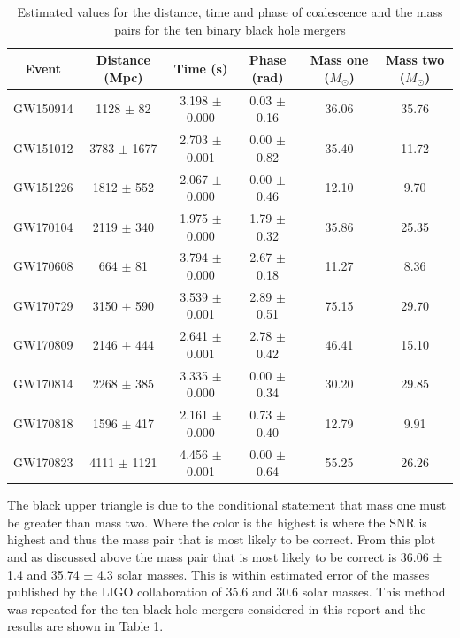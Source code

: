 \documentclass[]{article}
\begin{document}
\begin{table}[h]
    \begin{center}
        \caption{Estimated values for the distance, time and phase of coalescence and the mass pairs for the ten binary black hole mergers}
        \label{tab:estimates}
        \begin{tabular}{|c c c c c c|}
            \hline
            Event & Distance (Mpc) & Time (s) & Phase (rad) & Mass one ($M_{\odot}$) & Mass two ($M_{\odot}$)\\
            \hline
            GW150914 & 1128 $\pm$ 82 & 3.198 $\pm$ 0.000 & 0.03 $\pm$ 0.16 & 36.06 & 35.76 \\
            GW151012 & 3783 $\pm$ 1677 & 2.703 $\pm$ 0.001 & 0.00 $\pm$ 0.82 & 35.40 & 11.72 \\
            GW151226 & 1812 $\pm$ 552 & 2.067 $\pm$ 0.000 & 0.00 $\pm$ 0.46 & 12.10 & 9.70 \\
            GW170104 & 2119 $\pm$ 340 & 1.975 $\pm$ 0.000 & 1.79 $\pm$ 0.32 & 35.86 & 25.35 \\
            GW170608 & 664 $\pm$ 81 & 3.794 $\pm$ 0.000 & 2.67 $\pm$ 0.18 & 11.27 & 8.36 \\
            GW170729 & 3150 $\pm$ 590 & 3.539 $\pm$ 0.001 & 2.89 $\pm$ 0.51 & 75.15 & 29.70 \\
            GW170809 & 2146 $\pm$ 444 & 2.641 $\pm$ 0.001 & 2.78 $\pm$ 0.42 & 46.41 & 15.10 \\
            GW170814 & 2268 $\pm$ 385 & 3.335 $\pm$ 0.000 & 0.00 $\pm$ 0.34 & 30.20 & 29.85 \\
            GW170818 & 1596 $\pm$ 417 & 2.161 $\pm$ 0.000 & 0.73 $\pm$ 0.40 & 12.79 & 9.91 \\
            GW170823 & 4111 $\pm$ 1121 & 4.456 $\pm$ 0.001 & 0.00 $\pm$ 0.64 & 55.25 & 26.26 \\
            \hline
        \end{tabular}

    \end{center}
\end{table}

The black upper triangle is due to the conditional statement that mass one must be greater than mass two. Where the
color is the highest is where the SNR is highest and thus the mass pair that is most likely
to be correct. From this plot and as discussed above the mass pair that is most likely to
be correct is 36.06 ± 1.4 and 35.74 ± 4.3 solar masses. This is within estimated error of the masses published
by the LIGO collaboration of 35.6 and 30.6 solar masses. This method was repeated for the ten
black hole mergers considered in this report and the results are shown in Table 1.
\end{document}
